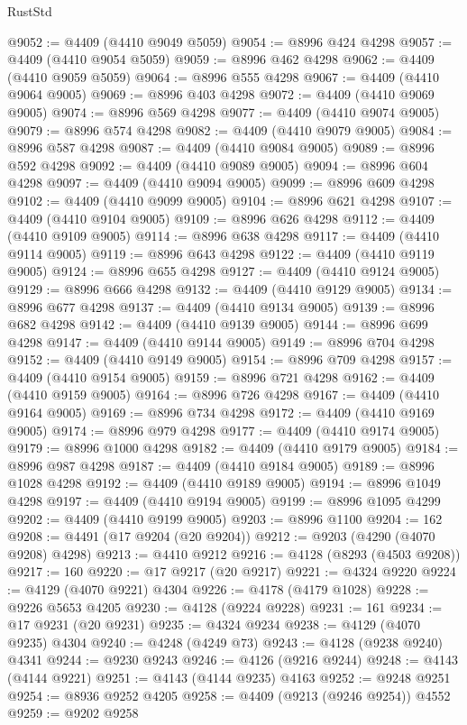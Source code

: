 \begin{lexlean}{RustStd}
\begin{coremodule}
@9052 := @4409 (@4410 @9049 @5059)
@9054 := @8996 @424 @4298
@9057 := @4409 (@4410 @9054 @5059)
@9059 := @8996 @462 @4298
@9062 := @4409 (@4410 @9059 @5059)
@9064 := @8996 @555 @4298
@9067 := @4409 (@4410 @9064 @9005)
@9069 := @8996 @403 @4298
@9072 := @4409 (@4410 @9069 @9005)
@9074 := @8996 @569 @4298
@9077 := @4409 (@4410 @9074 @9005)
@9079 := @8996 @574 @4298
@9082 := @4409 (@4410 @9079 @9005)
@9084 := @8996 @587 @4298
@9087 := @4409 (@4410 @9084 @9005)
@9089 := @8996 @592 @4298
@9092 := @4409 (@4410 @9089 @9005)
@9094 := @8996 @604 @4298
@9097 := @4409 (@4410 @9094 @9005)
@9099 := @8996 @609 @4298
@9102 := @4409 (@4410 @9099 @9005)
@9104 := @8996 @621 @4298
@9107 := @4409 (@4410 @9104 @9005)
@9109 := @8996 @626 @4298
@9112 := @4409 (@4410 @9109 @9005)
@9114 := @8996 @638 @4298
@9117 := @4409 (@4410 @9114 @9005)
@9119 := @8996 @643 @4298
@9122 := @4409 (@4410 @9119 @9005)
@9124 := @8996 @655 @4298
@9127 := @4409 (@4410 @9124 @9005)
@9129 := @8996 @666 @4298
@9132 := @4409 (@4410 @9129 @9005)
@9134 := @8996 @677 @4298
@9137 := @4409 (@4410 @9134 @9005)
@9139 := @8996 @682 @4298
@9142 := @4409 (@4410 @9139 @9005)
@9144 := @8996 @699 @4298
@9147 := @4409 (@4410 @9144 @9005)
@9149 := @8996 @704 @4298
@9152 := @4409 (@4410 @9149 @9005)
@9154 := @8996 @709 @4298
@9157 := @4409 (@4410 @9154 @9005)
@9159 := @8996 @721 @4298
@9162 := @4409 (@4410 @9159 @9005)
@9164 := @8996 @726 @4298
@9167 := @4409 (@4410 @9164 @9005)
@9169 := @8996 @734 @4298
@9172 := @4409 (@4410 @9169 @9005)
@9174 := @8996 @979 @4298
@9177 := @4409 (@4410 @9174 @9005)
@9179 := @8996 @1000 @4298
@9182 := @4409 (@4410 @9179 @9005)
@9184 := @8996 @987 @4298
@9187 := @4409 (@4410 @9184 @9005)
@9189 := @8996 @1028 @4298
@9192 := @4409 (@4410 @9189 @9005)
@9194 := @8996 @1049 @4298
@9197 := @4409 (@4410 @9194 @9005)
@9199 := @8996 @1095 @4299
@9202 := @4409 (@4410 @9199 @9005)
@9203 := @8996 @1100
@9204 := 162
@9208 := @4491 (@17 @9204 (@20 @9204))
@9212 := @9203 (@4290 (@4070 @9208) @4298)
@9213 := @4410 @9212
@9216 := @4128 (@8293 (@4503 @9208))
@9217 := 160
@9220 := @17 @9217 (@20 @9217)
@9221 := @4324 @9220
@9224 := @4129 (@4070 @9221) @4304
@9226 := @4178 (@4179 @1028)
@9228 := @9226 @5653 @4205
@9230 := @4128 (@9224 @9228)
@9231 := 161
@9234 := @17 @9231 (@20 @9231)
@9235 := @4324 @9234
@9238 := @4129 (@4070 @9235) @4304
@9240 := @4248 (@4249 @73)
@9243 := @4128 (@9238 @9240) @4341
@9244 := @9230 @9243
@9246 := @4126 (@9216 @9244)
@9248 := @4143 (@4144 @9221)
@9251 := @4143 (@4144 @9235) @4163
@9252 := @9248 @9251
@9254 := @8936 @9252 @4205
@9258 := @4409 (@9213 (@9246 @9254)) @4552
@9259 := @9202 @9258

\end{coremodule}
\end{lexlean}
